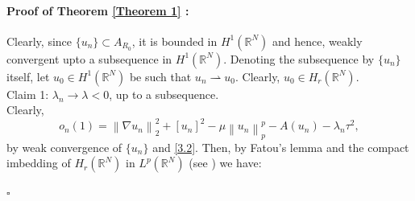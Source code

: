 \documentclass[11pt]{article}
\numberwithin{equation}{section}
\numberwithin{mytheorem}{section}
\newenvironment{myproof}[2] {\paragraph{Proof of {#1} {#2} :}}{\hfill$\square$}
\begin{document}
\begin{myproof}{Theorem}{\ref{Theorem 1}}
			Clearly, since $\{u_n\}\subset A_{R_0}$, it is bounded in $H^1(\mathbb{R}^N)$ and hence, weakly convergent upto a subsequence in $H^1(\mathbb{R}^N)$. Denoting the subsequence by $\{u_n\}$ itself, let $u_0\in H^1(\mathbb{R}^N)$ be such that $u_n\rightharpoonup u_0$. Clearly, $u_0\in H_r(\mathbb{R}^N)$.\\
			Claim 1: $\lambda_n \rightarrow \lambda<0$, up to a subsequence.\\
			Clearly,
			\begin{equation}\label{new_eq}
				o_n(1)= \left\| \nabla u_n \right\|_2^2+[u_n]^2-\mu \left\| u_n \right\|_p^p-A(u_n)-\lambda_n\tau^2,
			\end{equation}
			by weak convergence of $\{u_n\}$ and \eqref{3.2}.
			Then, by Fatou's lemma and the compact imbedding of $H_r(\mathbb{R}^N)$ in $L^p(\mathbb{R}^N)$ (see \cite[Lemma~3.1.4]{Badiale2010Semilinear}) we have:

\end{myproof}
\end{document}
